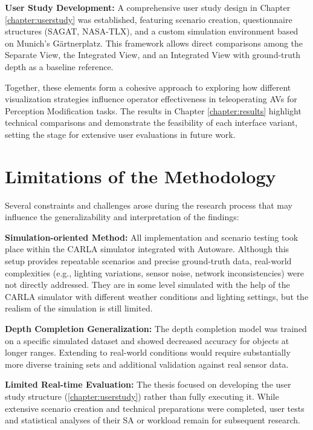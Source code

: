     \textbf{User Study Development:}
    A comprehensive user study design in Chapter \ref{chapter:userstudy} was established, featuring scenario creation, questionnaire structures (\ac{SAGAT}, \ac{NASA-TLX}), and a custom simulation environment based on Munich’s Gärtnerplatz. This framework allows direct comparisons among the Separate View, the Integrated View, and an Integrated View with ground-truth depth as a baseline reference.


Together, these elements form a cohesive approach to exploring how different visualization strategies influence operator effectiveness in teleoperating \acp{AV} for Perception Modification tasks. The results in Chapter \ref{chapter:results} highlight technical comparisons and demonstrate the feasibility of each interface variant, setting the stage for extensive user evaluations in future work.

\section{Limitations of the Methodology}

Several constraints and challenges arose during the research process that may influence the generalizability and interpretation of the findings:

    \textbf{Simulation-oriented Method:} All implementation and scenario testing took place within the CARLA simulator integrated with Autoware. Although this setup provides repeatable scenarios and precise ground-truth data, real-world complexities (e.g., lighting variations, sensor noise, network inconsistencies) were not directly addressed. They are in some level simulated with the help of the CARLA simulator with different weather conditions and lighting settings, but the realism of the simulation is still limited.

    \textbf{Depth Completion Generalization:}
    The depth completion model was trained on a specific simulated dataset and showed decreased accuracy for objects at longer ranges. Extending to real-world conditions would require substantially more diverse training sets and additional validation against real sensor data.

    \textbf{Limited Real-time Evaluation:}
    The thesis focused on developing the user study structure (\ref{chapter:userstudy}) rather than fully executing it. While extensive scenario creation and technical preparations were completed, user tests and statistical analyses of their \ac{SA} or workload remain for subsequent research.


